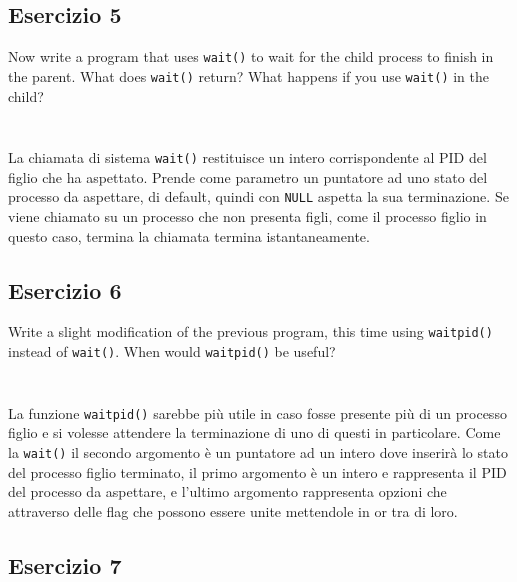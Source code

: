 \documentclass{article}
\numberwithin{equation}{subsection}
\begin{document}
\inputminted[firstline=1, lastline=4]{c}{./Esercitazione del 29-10-24/domanda3.c}
\inputminted[firstline=9, lastline=16]{c}{./Esercitazione del 29-10-24/domanda3.c}

\subsection{Esercizio 5}

Now write a program that uses \verb|wait()| to wait for the child process to finish in the parent. What does 
\verb|wait()| return? What happens if you use \verb|wait()| in the child?


\inputminted[firstline=1, lastline=4]{c}{./Esercitazione del 29-10-24/domanda5.c}
\inputminted[firstline=11, lastline=19]{c}{./Esercitazione del 29-10-24/domanda5.c}

La chiamata di sistema \verb|wait()| restituisce un intero corrispondente al PID del figlio 
che ha aspettato. Prende come parametro un puntatore ad uno stato del processo da aspettare, 
di default, quindi con \verb|NULL| aspetta la sua terminazione. Se viene chiamato su un 
processo che non presenta figli, come il processo figlio in questo caso, termina la chiamata termina istantaneamente. 

\subsection{Esercizio 6}

Write a slight modification of the previous program, this time using \verb|waitpid()| instead of \verb|wait()|. 
When would \verb|waitpid()| be useful?

\inputminted[firstline=1, lastline=4]{c}{./Esercitazione del 29-10-24/domanda6.c}
\inputminted[firstline=10, lastline=19]{c}{./Esercitazione del 29-10-24/domanda6.c}

La funzione \verb|waitpid()| sarebbe più utile in caso fosse presente più di un processo figlio 
e si volesse attendere la terminazione di uno di questi in particolare. Come 
la \verb|wait()| il secondo argomento è un puntatore ad un intero dove inserirà lo 
stato del processo figlio terminato, il primo argomento è un intero e rappresenta il 
PID del processo da aspettare, e l'ultimo argomento rappresenta opzioni che attraverso 
delle flag che possono essere unite mettendole in or tra di loro. 

\subsection{Esercizio 7}
\end{document}
